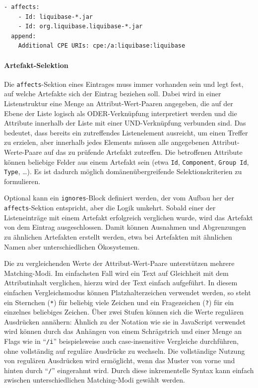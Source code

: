 \begin{lstlisting}[style=yaml,caption={Korrelationseintrag für die Java-Komponente Liquibase},label={lst:correlation-initial-example}]
- affects:
    - Id: liquibase-*.jar
    - Id: org.liquibase.liquibase-*.jar
  append:
    Additional CPE URIs: cpe:/a:liquibase:liquibase
\end{lstlisting}

\paragraph{Artefakt-Selektion}
Die \texttt{affects}-Sektion eines Eintrages muss immer vorhanden sein und legt fest, auf welche Artefakte sich der Eintrag beziehen soll.
Dabei wird in einer Listenstruktur eine Menge an Attribut-Wert-Paaren angegeben, die auf der Ebene der Liste logisch als ODER-Verknüpfung interpretiert werden und die Attribute innerhalb der Liste mit einer UND-Verknüpfung verbunden sind.
Das bedeutet, dass bereits ein zutreffendes Listenelement ausreicht, um einen Treffer zu erzielen, aber innerhalb jedes Elements müssen alle angegebenen Attribut-Werte-Paare auf das zu prüfende Artefakt zutreffen.
Die betroffenen Attribute können beliebige Felder aus einem Artefakt sein (etwa \texttt{Id}, \texttt{Component}, \texttt{Group Id}, \texttt{Type}, \ldots).
Es ist dadurch möglich domänenübergreifende Selektionskriterien zu formulieren.

Optional kann ein \texttt{ignores}-Block definiert werden, der vom Aufbau her der \texttt{affects}-Sektion entspricht, aber die Logik umkehrt.
Sobald einer der Listeneinträge mit einem Artefakt erfolgreich verglichen wurde, wird das Artefakt von dem Eintrag ausgeschlossen.
Damit können Ausnahmen und Abgrenzungen zu ähnlichen Artefakten erstellt werden, etwa bei Artefakten mit ähnlichen Namen aber unterschiedlichen Ökosystemen.

Die zu vergleichenden Werte der Attribut-Wert-Paare unterstützen mehrere Matching-Modi.
Im einfachsten Fall wird ein Text auf Gleichheit mit dem Attributinhalt verglichen, hierzu wird der Text einfach aufgeführt.
In diesem einfachen Vergleichsmodus können Platzhalterzeichen verwendet werden, so steht ein Sternchen (\texttt{*}) für beliebig viele Zeichen und ein Fragezeichen (\texttt{?}) für ein einzelnes beliebiges Zeichen.
Über zwei Stufen können sich die Werte regulären Ausdrücken annähern:
Ähnlich zu der Notation wie sie in JavaScript verwendet wird \autocite{MdnRegularExpressions2025} können durch das Anhängen von einem Schrägstrich und einer Menge an Flags wie in \enquote{\texttt{/i}} beispielsweise auch case-insensitive Vergleiche durchführen, ohne vollständig auf reguläre Ausdrücke zu wechseln.
Die vollständige Nutzung von regulären Ausdrücken wird ermöglicht, wenn das Muster von vorne und hinten durch \enquote{\texttt{/}} eingerahmt wird.
Durch diese inkrementelle Syntax kann einfach zwischen unterschiedlichen Matching-Modi gewählt werden.

